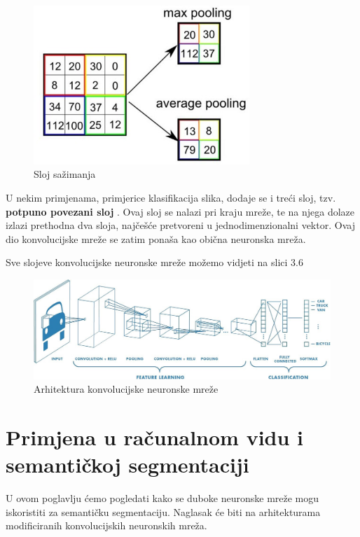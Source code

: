 \begin{figure}[htb]
\centering
\includegraphics[height=6cm]{slike/poolingLayer.png}
\caption{Sloj sažimanja \citep{towardsDSCNN}}
\label{fig:fer-logo}
\end{figure}
\textbf{}

\noindent U nekim primjenama, primjerice klasifikacija slika, dodaje se i treći sloj, tzv. \textbf{potpuno povezani sloj} . Ovaj sloj se nalazi pri kraju mreže, te na njega dolaze izlazi prethodna dva sloja, najčešće pretvoreni u jednodimenzionalni vektor. Ovaj dio konvolucijske mreže se zatim ponaša kao obična neuronska mreža.

\noindent Sve slojeve konvolucijske neuronske mreže možemo vidjeti na slici 3.6\\



\begin{figure}[htb]
\hspace{-2cm}
\includegraphics[width=17cm]{slike/CNNFull.jpeg}
\caption{Arhitektura konvolucijske neuronske mreže \citep{towardsDSCNN}}
\label{fig:fer-logo}
\end{figure}
\textbf{}


\section{Primjena u računalnom vidu i semantičkoj segmentaciji}
U ovom poglavlju ćemo pogledati kako se duboke neuronske mreže mogu iskoristiti za semantičku segmentaciju. Naglasak će biti na arhitekturama modificiranih konvolucijskih neuronskih mreža.

